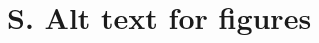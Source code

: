 \documentclass[12pt]{article}
\begin{document}
















\section{S. Alt text for figures}
\end{document}
